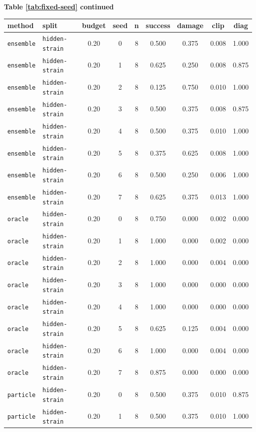 \documentclass{article}
\begin{document}
\begin{center}
\textbf{Table \ref{tab:fixed-seed} continued}\\[0.4ex]
\begin{tabular}{llccccccc}
\toprule
method & split & budget & seed & n & success & damage & clip & diag \\
\midrule
\texttt{ensemble} & \texttt{hidden-strain} & 0.20 & 0 & 8 & 0.500 & 0.375 & 0.008 & 1.000 \\
\texttt{ensemble} & \texttt{hidden-strain} & 0.20 & 1 & 8 & 0.625 & 0.250 & 0.008 & 0.875 \\
\texttt{ensemble} & \texttt{hidden-strain} & 0.20 & 2 & 8 & 0.125 & 0.750 & 0.010 & 1.000 \\
\texttt{ensemble} & \texttt{hidden-strain} & 0.20 & 3 & 8 & 0.500 & 0.375 & 0.008 & 0.875 \\
\texttt{ensemble} & \texttt{hidden-strain} & 0.20 & 4 & 8 & 0.500 & 0.375 & 0.010 & 1.000 \\
\texttt{ensemble} & \texttt{hidden-strain} & 0.20 & 5 & 8 & 0.375 & 0.625 & 0.008 & 1.000 \\
\texttt{ensemble} & \texttt{hidden-strain} & 0.20 & 6 & 8 & 0.500 & 0.250 & 0.006 & 1.000 \\
\texttt{ensemble} & \texttt{hidden-strain} & 0.20 & 7 & 8 & 0.625 & 0.375 & 0.013 & 1.000 \\
\texttt{oracle} & \texttt{hidden-strain} & 0.20 & 0 & 8 & 0.750 & 0.000 & 0.002 & 0.000 \\
\texttt{oracle} & \texttt{hidden-strain} & 0.20 & 1 & 8 & 1.000 & 0.000 & 0.002 & 0.000 \\
\texttt{oracle} & \texttt{hidden-strain} & 0.20 & 2 & 8 & 1.000 & 0.000 & 0.004 & 0.000 \\
\texttt{oracle} & \texttt{hidden-strain} & 0.20 & 3 & 8 & 1.000 & 0.000 & 0.000 & 0.000 \\
\texttt{oracle} & \texttt{hidden-strain} & 0.20 & 4 & 8 & 1.000 & 0.000 & 0.000 & 0.000 \\
\texttt{oracle} & \texttt{hidden-strain} & 0.20 & 5 & 8 & 0.625 & 0.125 & 0.004 & 0.000 \\
\texttt{oracle} & \texttt{hidden-strain} & 0.20 & 6 & 8 & 1.000 & 0.000 & 0.004 & 0.000 \\
\texttt{oracle} & \texttt{hidden-strain} & 0.20 & 7 & 8 & 0.875 & 0.000 & 0.000 & 0.000 \\
\texttt{particle} & \texttt{hidden-strain} & 0.20 & 0 & 8 & 0.500 & 0.375 & 0.010 & 0.875 \\
\texttt{particle} & \texttt{hidden-strain} & 0.20 & 1 & 8 & 0.500 & 0.375 & 0.010 & 1.000 \\

\end{tabular}
\end{center}
\end{document}
